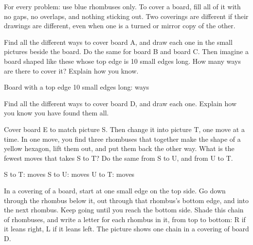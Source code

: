 \documentclass[12pt]{extarticle}
\begin{document}
For every problem: use blue rhombuses only. To cover a board, fill all of it with
no gaps, no overlaps, and nothing sticking out. Two coverings are different if
their drawings are different, even when one is a turned or mirror copy of the
other.

\bigskip
{}Find all the different ways to cover board A, and draw each one in the
small pictures beside the board. Do the same for board B and board C. Then
imagine a board shaped like these whose top edge is 10 small edges long. How
many ways are there to cover it? Explain how you know.

\vspace{0.3in}

\newpage
Board with a top edge 10 small edges long: \underline{\hspace{0.8in}} ways

\vspace{0.4in}
Find all the different ways to cover board D, and draw each one.
Explain how you know you have found them all.

\vspace{0.3in}

\newpage
{}Cover board E to match picture S. Then change it into picture T, one
move at a time. In one move, you find three rhombuses that together make the
shape of a yellow hexagon, lift them out, and put them back the other way. What is the
fewest moves that takes S to T? Do the same from S to U, and from U to T.

\vspace{0.3in}

\vspace{0.3in}
S to T: \underline{\hspace{0.7in}} moves \hfill
S to U: \underline{\hspace{0.7in}} moves \hfill
U to T: \underline{\hspace{0.7in}} moves

\newpage
{}In a covering of a board, start at one small edge on the top side.
Go down through the rhombus below it, out through that rhombus's bottom edge, and
into the next rhombus. Keep going until you reach the bottom side. Shade this
chain of rhombuses, and write a letter for each rhombus in it, from top to
bottom: R if it leans right, L if it leans left. The picture shows one chain in
a covering of board D.

\vspace{0.2in}
\end{document}
